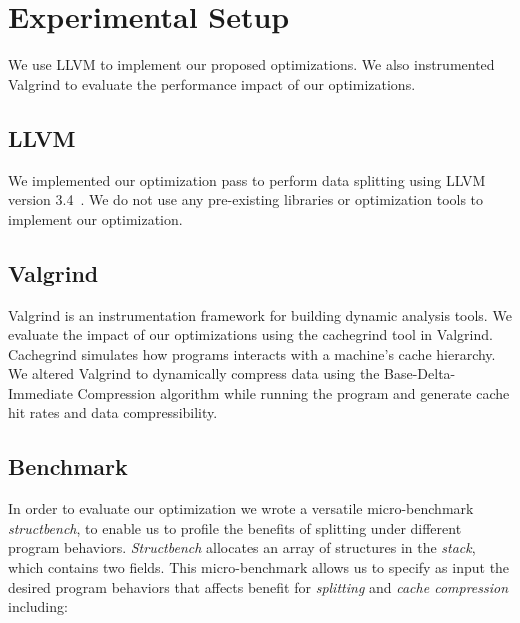 \section{Experimental Setup}
\label{sec:exp}

We use LLVM to implement our proposed optimizations. We also instrumented
Valgrind to evaluate the performance impact of our optimizations.

\subsection{LLVM}
\label{sec:exp-llvm}

We implemented our optimization pass to perform data splitting using LLVM
version 3.4~\cite{llvm}. We do not use any pre-existing libraries or optimization tools
to implement our optimization. 

\subsection{Valgrind}
\label{sec:exp-val}

Valgrind is an instrumentation framework for building dynamic analysis tools. We
evaluate the impact of our optimizations using the cachegrind tool in Valgrind.
Cachegrind simulates how programs interacts with a machine's cache hierarchy. We
altered Valgrind to dynamically compress data using the Base-Delta-Immediate
Compression algorithm while running the program and generate cache hit rates and
data compressibility. 

\subsection{Benchmark}
\label{sec:exp-ben}

In order to evaluate our optimization we wrote a versatile micro-benchmark {\em
structbench}, to enable us to profile the benefits of splitting under different
program behaviors. {\em Structbench} allocates an array of structures in the
{\em stack}, which contains two fields. This micro-benchmark allows us to
specify as input the desired program behaviors that affects benefit for {\em
splitting} and {\em cache compression} including:

\squishlist


